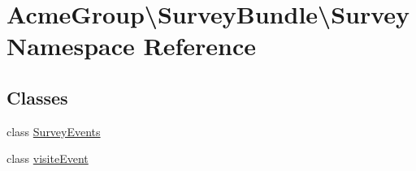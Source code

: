 \hypertarget{namespace_acme_group_1_1_survey_bundle_1_1_survey}{\section{Acme\+Group\textbackslash{}Survey\+Bundle\textbackslash{}Survey Namespace Reference}
\label{namespace_acme_group_1_1_survey_bundle_1_1_survey}
}
\subsection*{Classes}
\begin{DoxyCompactItemize}
\item 
class \hyperlink{class_acme_group_1_1_survey_bundle_1_1_survey_1_1_survey_events}{Survey\+Events}
\item 
class \hyperlink{class_acme_group_1_1_survey_bundle_1_1_survey_1_1visite_event}{visite\+Event}
\end{DoxyCompactItemize}
